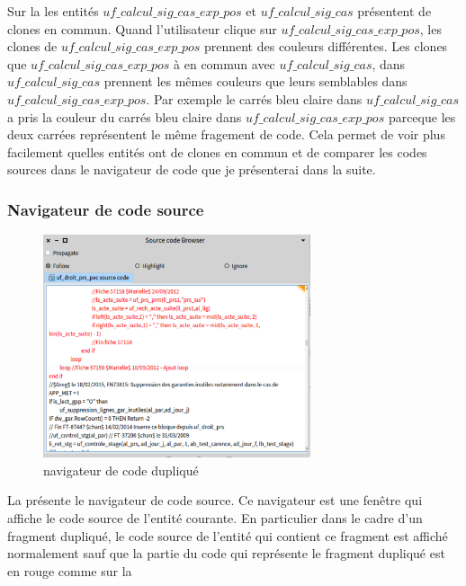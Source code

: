 \documentclass[a4paper]{article}
\begin{document}
Sur la  les entités $uf\_calcul\_sig\_cas\_exp\_pos$ et $uf\_calcul\_sig\_cas$  présentent de clones en commun.
Quand l'utilisateur clique sur $uf\_calcul\_sig\_cas\_exp\_pos$, les clones de $uf\_calcul\_sig\_cas\_exp\_pos$ prennent des couleurs différentes.
Les clones que $uf\_calcul\_sig\_cas\_exp\_pos$ à en commun avec $uf\_calcul\_sig\_cas$, dans $uf\_calcul\_sig\_cas$ prennent les mêmes couleurs que leurs semblables dans $uf\_calcul\_sig\_cas\_exp\_pos$.
Par exemple le carrés bleu claire dans $uf\_calcul\_sig\_cas$ a pris la couleur du carrés bleu claire  dans $uf\_calcul\_sig\_cas\_exp\_pos$
parceque les deux carrées représentent le même fragement de code.  
Cela permet de voir plus facilement quelles entités ont de clones en commun et de comparer les codes sources dans le navigateur de code que je présenterai dans la suite. 

\subsubsection{Navigateur de code source}
\begin{figure}[htbp]
  \begin{center}
  \includegraphics[width=0.7\textwidth]{./figures/sourceCodeBrowser.png}
  \caption{navigateur de code dupliqué}
  \label{fig:sourceCodeBrowser}
\end{center}
\vspace{-0.3cm}
\end{figure}
La  présente le navigateur de code source. 
Ce navigateur est une fenêtre qui affiche le code source de l'entité courante.
En particulier dans le cadre d'un fragment dupliqué, le code source de l'entité qui contient ce fragment est affiché normalement sauf que la partie du code qui représente le fragment dupliqué est en rouge comme sur la 
\end{document}
